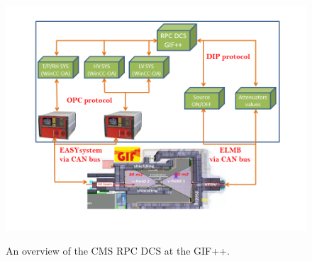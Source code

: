 \begin{figure}[h]
\centering
\includegraphics[scale=0.4,trim=60 30 60 30,clip]{fig/wincc/DCS_sys.png}\\
 \caption{An overview of the CMS RPC DCS at the GIF++.}
\label{fig:DCS_sys}
\end{figure}
